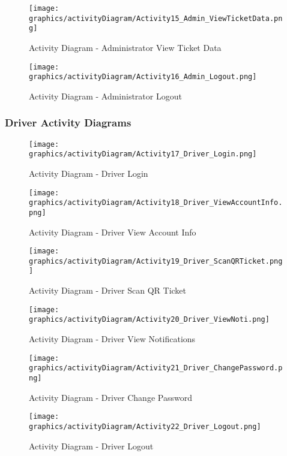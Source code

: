         \begin{figure}[H]
            \centering
            \texttt{[image: graphics/activityDiagram/Activity15\_Admin\_ViewTicketData.png]}
            \caption{Activity Diagram - Administrator View Ticket Data}
        \label{fig:activitydiagram15}
        \end{figure}
        \begin{figure}[H]
            \centering
            \texttt{[image: graphics/activityDiagram/Activity16\_Admin\_Logout.png]}
            \caption{Activity Diagram - Administrator Logout}
        \label{fig:activitydiagram16}
        \end{figure}

    \subsubsection{Driver Activity Diagrams}
        \begin{figure}[H]
            \centering
            \texttt{[image: graphics/activityDiagram/Activity17\_Driver\_Login.png]}
            \caption{Activity Diagram - Driver Login}
        \label{fig:activitydiagram17}
        \end{figure}
        \begin{figure}[H]
            \centering
            \texttt{[image: graphics/activityDiagram/Activity18\_Driver\_ViewAccountInfo.png]}
            \caption{Activity Diagram - Driver View Account Info}
        \label{fig:activitydiagram18}
        \end{figure}
        \begin{figure}[H]
            \centering
            \texttt{[image: graphics/activityDiagram/Activity19\_Driver\_ScanQRTicket.png]}
            \caption{Activity Diagram - Driver Scan QR Ticket}
        \label{fig:activitydiagram19}
        \end{figure}
        \begin{figure}[H]
            \centering
            \texttt{[image: graphics/activityDiagram/Activity20\_Driver\_ViewNoti.png]}
            \caption{Activity Diagram - Driver View Notifications}
        \label{fig:activitydiagram20}
        \end{figure}
        \begin{figure}[H]
            \centering
            \texttt{[image: graphics/activityDiagram/Activity21\_Driver\_ChangePassword.png]}
            \caption{Activity Diagram - Driver Change Password}
        \label{fig:activitydiagram21}
        \end{figure}
        \begin{figure}[H]
            \centering
            \texttt{[image: graphics/activityDiagram/Activity22\_Driver\_Logout.png]}
            \caption{Activity Diagram - Driver Logout}
        \label{fig:activitydiagram22}
        \end{figure}